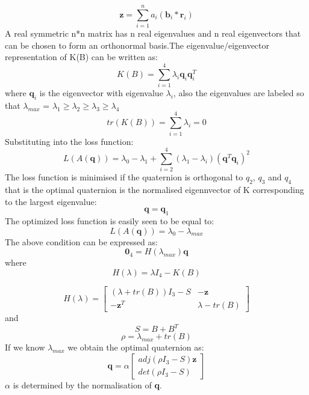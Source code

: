 \documentclass[../../main.tex]{subfiles}
\begin{document}
{{{\begin{equation}
    \textbf{z}= \sum_{i=1}^{n} a_{i} (\textbf{b}_{i} * \textbf{r}_{i})
\end{equation}
A real symmetric n*n matrix has n real eigenvalues and n real eigenvectors that can be chosen to form an  orthonormal basis.The eigenvalue/eigenvector representation of K(B) can be written as:
\begin{equation}
    K(B)= \sum_{i=1}^{4} \lambda_{i} \textbf{q}_{i} \textbf{q}_{i}^{T}
\end{equation}
where $\textbf {q}_i $ is the eigenvector with eigenvalue $\lambda_i$, also the eigenvalues are labeled so that 
$\lambda_{max}$ = $\lambda_1 \geq \lambda_2 \geq \lambda_3 \geq \lambda_4$
\begin{equation}
 tr(K(B))= \sum_{i=1}^{4} \lambda_{i} =0   
\end{equation}
Substituting into the loss function:
\begin{equation}
    L(A(\textbf{q}))= \lambda_{0} - \lambda_{1} + \sum_{i=2}^{4} (\lambda_{1} - \lambda_{i}) (\textbf{q}^T \textbf{q}_{i})^{2}
\end{equation}
The loss function is minimised if the quaternion is orthogonal to $q_2$, $q_3$ and $q_4$ that is the optimal quaternion is the normalised eigennvector of K corresponding to the largest eigenvalue:
\begin{equation}
    \textbf{q}= \textbf{q}_{1}
\end{equation}
The optimized loss function is easily seen to be equal to:
\begin{equation}
    L(A(\textbf{q}))= \lambda_{0}- \lambda_{max}
\end{equation}
The above condition can be expressed as:
\begin{equation}
\textbf{0}_4 = H(\lambda_{max}) \textbf{q}
\end{equation}
where 
\begin{equation}
H(\lambda)= \lambda I_{4} - K(B)
\end{equation}

\[
 H(\lambda)=
  \begin{bmatrix}
 (\lambda+ tr(B)) I_{3} - S  & -\textbf{z}    \\
  -\textbf{z}^T  &  \lambda- tr(B)
  \end{bmatrix}
\]
and 
\begin{equation}
    S= B + B^{T}
\end{equation}
\begin{equation}
    \rho= \lambda_{max} + tr(B)
\end{equation}
If we know $\lambda _{max}$ we obtain the optimal quaternion as:
\begin{equation}
    \textbf{q}=\alpha
    \begin{bmatrix}
    adj(\rho I_{3} - S)\textbf{z} \\
    det(\rho I_{3} - S)
    \end{bmatrix}
\end{equation}
\(\alpha\) is determined by the normalisation of \textbf{q}.

}}}
\end{document}
